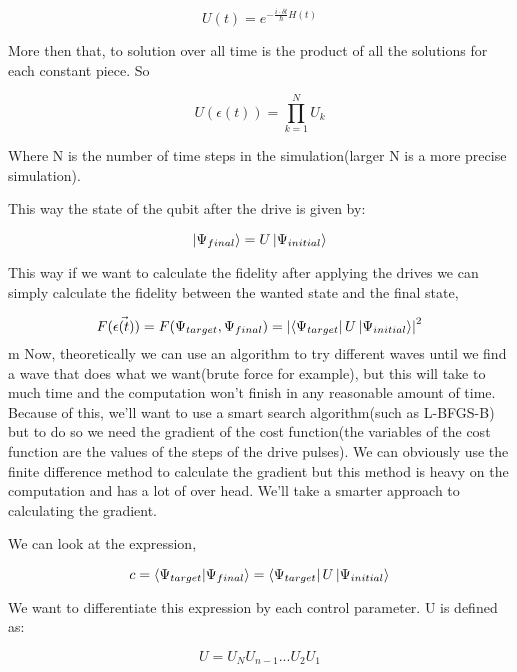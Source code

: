 \documentclass{article}
\numberwithin{equation}{section}
\begin{document}
\begin{equation}
U(t) = e^{-\frac{i\cdot \delta t}{\hbar}H(t)}
\end{equation}

More then that, to solution over all time is the product of all the solutions for each constant piece. So

\begin{equation}
U(\epsilon(t)) = \prod_{k = 1}^NU_k
\end{equation}

Where N is the number of time steps in the simulation(larger N is a more precise simulation). \par
This way the state of the qubit after the drive is given by:

\begin{equation}
\ket{\Psi_{final}} = U\ket{\Psi_{initial}}
\end{equation}

This way if we want to calculate the fidelity after applying the drives we can simply calculate the fidelity between the wanted state and the final state,

\begin{equation}
F(\Vec{\epsilon(t)}) = F(\Psi_{target}, \Psi_{final}) = \abs{\bra{\Psi_{target}}U\ket{\Psi_{initial}}}^2
\end{equation}
m
Now, theoretically we can use an algorithm to try different waves until we find a wave that does what we want(brute force for example), but this will take to much time and the computation won't finish in any reasonable amount of time. Because of this, we'll want to use a smart search algorithm(such as L-BFGS-B) but to do so we need the gradient of the cost function(the variables of the cost function are the values of the steps of the drive pulses). We can obviously use the finite difference method to calculate the gradient but this method is heavy on the computation and has a lot of over head. We'll take a smarter approach to calculating the gradient.\par
We can look at the expression,  %

\begin{equation}
c = \braket{\Psi_{target}}{\Psi_{final}} = \bra{\Psi_{target}}U\ket{\Psi_{initial}}
\end{equation}

We want to differentiate this expression by each control parameter. U is defined as:

$$U = U_N U_{n-1}...U_2 U_1$$
\end{document}

